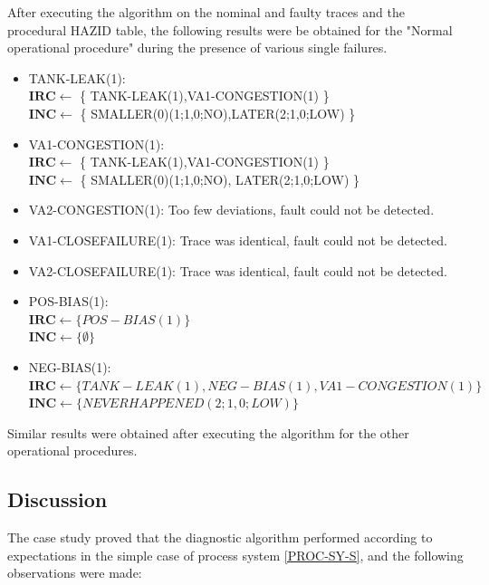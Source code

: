 \documentclass[conference]{IEEEtran}
\begin{document}
After executing the algorithm on the nominal and faulty traces and the procedural HAZID table, the following results were be obtained for the "Normal operational procedure" during the presence of various single failures.

\begin{itemize}

\item TANK-LEAK(1): \\ $\mathbf{IRC} \leftarrow$ \{ TANK-LEAK(1),VA1-CONGESTION(1) \} \\ $\mathbf{INC} \leftarrow$ \{ SMALLER(0)(1;1,0;NO),LATER(2;1,0;LOW) \}

\item VA1-CONGESTION(1): \\ $\mathbf{IRC} \leftarrow $ \{ TANK-LEAK(1),VA1-CONGESTION(1) \}\\ $\mathbf{INC} \leftarrow$ \{ SMALLER(0)(1;1,0;NO), LATER(2;1,0;LOW) \}

\item VA2-CONGESTION(1): Too few deviations, fault could not be detected.

\item VA1-CLOSEFAILURE(1): Trace was identical, fault could not be detected.

\item VA2-CLOSEFAILURE(1): Trace was identical, fault could not be detected.

\item POS-BIAS(1): \\ $\mathbf{IRC} \leftarrow \{ POS-BIAS(1) \}$ \\ $\mathbf{INC} \leftarrow \{ \emptyset \} $

\item NEG-BIAS(1): \\ $\mathbf{IRC} \leftarrow \{ TANK-LEAK(1), NEG-BIAS(1), VA1-CONGESTION(1) \}$ \\ $\mathbf{INC} \leftarrow \{ NEVERHAPPENED(2;1,0;LOW) \}$

\end{itemize}

Similar results were obtained after executing the algorithm for the other operational procedures.

\subsection{Discussion}

The case study proved that the diagnostic algorithm performed according to expectations in the simple case of process system \ref{PROC-SY-S}, and the following observations were made:
\end{document}
